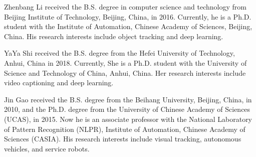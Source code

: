 \documentclass[journal]{IEEEtran}
\begin{document}
\normalem



\begin{IEEEbiography}
{Zhenbang Li}
received the B.S. degree in computer science and technology from Beijing Institute of Technology, Beijing, China, in 2016. Currently, he is a Ph.D. student with the Institute of Automation, Chinese Academy of Sciences, Beijing, China. His research interests include object tracking and deep learning.
\end{IEEEbiography}

\begin{IEEEbiography}
  {YaYa Shi}
  received the B.S. degree from the Hefei University of Technology, Anhui, China in 2018. Currently, She is a Ph.D. student with the University of Science and Technology of China, Anhui, China. Her research interests include video captioning and deep learning.
\end{IEEEbiography}

\begin{IEEEbiography}
{Jin Gao}
received the B.S. degree from the Beihang University, Beijing, China, in 2010, and the Ph.D. degree from the University of Chinese Academy of Sciences (UCAS), in 2015. Now he is an associate professor with the National Laboratory of Pattern Recognition (NLPR), Institute of Automation, Chinese Academy of Sciences (CASIA). His research interests include visual tracking, autonomous vehicles, and service robots.
\end{IEEEbiography}
\end{document}
